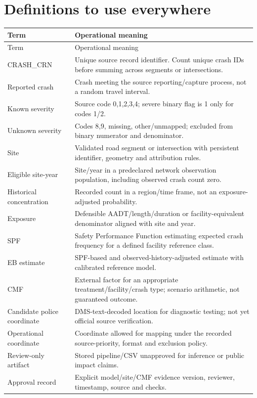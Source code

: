 \documentclass[11pt,a4paper,openany]{report}
\begin{document}
\section{Definitions to use everywhere}
\small
\begin{longtable}{@{}L{43mm}L{99mm}@{}}\toprule Term & Operational meaning\\\midrule\endfirsthead
\toprule Term & Operational meaning\\\midrule\endhead
CRASH\_CRN & Unique source record identifier. Count unique crash IDs before summing across segments or intersections.\\
Reported crash & Crash meeting the source reporting/capture process, not a random travel interval.\\
Known severity & Source code 0,1,2,3,4; severe binary flag is 1 only for codes 1/2.\\
Unknown severity & Codes 8,9, missing, other/unmapped; excluded from binary numerator and denominator.\\
Site & Validated road segment or intersection with persistent identifier, geometry and attribution rules.\\
Eligible site-year & Site/year in a predeclared network observation population, including observed crash count zero.\\
Historical concentration & Recorded count in a region/time frame, not an exposure-adjusted probability.\\
Exposure & Defensible AADT/length/duration or facility-equivalent denominator aligned with site and year.\\
SPF & Safety Performance Function estimating expected crash frequency for a defined facility reference class.\\
EB estimate & SPF-based and observed-history-adjusted estimate with calibrated reference model.\\
CMF & External factor for an appropriate treatment/facility/crash type; scenario arithmetic, not guaranteed outcome.\\
Candidate police coordinate & DMS-text-decoded location for diagnostic testing; not yet official source verification.\\
Operational coordinate & Coordinate allowed for mapping under the recorded source-priority, format and exclusion policy.\\
Review-only artifact & Stored pipeline/CSV unapproved for inference or public impact claims.\\
Approval record & Explicit model/site/CMF evidence version, reviewer, timestamp, source and checks.\\
\bottomrule\end{longtable}
\normalsize
\end{document}
